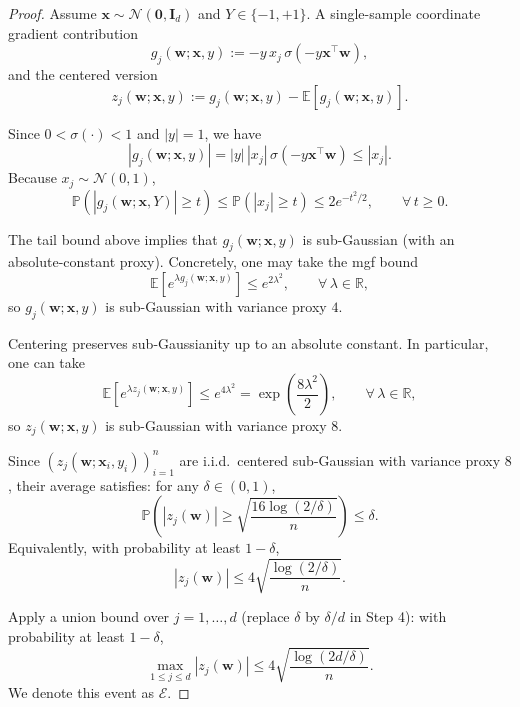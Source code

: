 \documentclass[10pt,a4paper]{amsart}
\begin{document}
\begin{proof}
Assume $\boldsymbol x\sim\mathcal N(\boldsymbol 0,\boldsymbol I_d)$ and $Y\in\{-1,+1\}$.
 A single-sample coordinate
gradient contribution
\[
g_j(\boldsymbol w;\boldsymbol x,y):=-y\,x_j\,\sigma(-y\boldsymbol x^\top \boldsymbol w),
\]
and the centered version
\[
z_j(\boldsymbol w;\boldsymbol x,y):=g_j(\boldsymbol w;\boldsymbol x,y)-\mathbb E\!\left[g_j(\boldsymbol w;\boldsymbol x,y)\right].
\]


Since $0<\sigma(\cdot)<1$ and $|y|=1$, we have
\[
|g_j(\boldsymbol w;\boldsymbol x,y)|
=
|y|\,|x_j|\,\sigma(-y\boldsymbol x^\top \boldsymbol w)
\le
|x_j|.
\]
Because $x_j\sim\mathcal N(0,1)$,
\[
\mathbb P\!\left(|g_j(\boldsymbol w;\boldsymbol x,Y)|\ge t\right)
\le
\mathbb P(|x_j|\ge t)
\le
2e^{-t^2/2},
\qquad \forall\,t\ge 0.
\]

The tail bound above implies that $g_j(\boldsymbol w;\boldsymbol x,y)$ is sub-Gaussian
(with an absolute-constant proxy). Concretely, one may take the mgf bound
\[
\mathbb E\!\left[e^{\lambda g_j(\boldsymbol w;\boldsymbol x,y)}\right]
\le
e^{2\lambda^2},
\qquad \forall\,\lambda\in\mathbb R,
\]
so $g_j(\boldsymbol w;\boldsymbol x,y)$ is sub-Gaussian with variance proxy $4$.

Centering preserves sub-Gaussianity up to an absolute constant. In particular, one can take
\[
\mathbb E\!\left[e^{\lambda z_j(\boldsymbol w;\boldsymbol x,y)}\right]
\le
e^{4\lambda^2}
=
\exp\!\left(\frac{8\lambda^2}{2}\right),
\qquad \forall\,\lambda\in\mathbb R,
\]
so $z_j(\boldsymbol w;\boldsymbol x,y)$ is sub-Gaussian with variance proxy $8$.

Since $(z_j(\boldsymbol w;\boldsymbol x_i,y_i))_{i=1}^n$ are i.i.d.\ centered sub-Gaussian
with variance proxy $8$, their average satisfies: for any $\delta\in(0,1)$,
\[
\mathbb P\!\left(
|z_j(\boldsymbol w)|
\ge
\sqrt{\frac{16\log(2/\delta)}{n}}
\right)
\le
\delta.
\]
Equivalently, with probability at least $1-\delta$,
\[
|z_j(\boldsymbol w)|
\le
4\sqrt{\frac{\log(2/\delta)}{n}}.
\]

Apply a union bound over $j=1,\dots,d$ (replace $\delta$ by $\delta/d$ in Step 4):
with probability at least $1-\delta$,
\[
\max_{1\le j\le d}|z_j(\boldsymbol w)|
\le
4\sqrt{\frac{\log(2d/\delta)}{n}}.
\]
We denote this event as $\mathcal{E}$. 
\end{proof}
\end{document}
